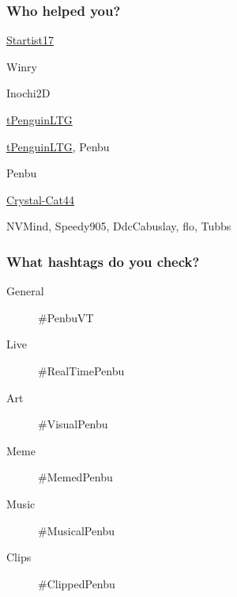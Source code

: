 \documentclass[lualatex,aspectratio=169]{beamer}
\begin{document}
  \begin{frame}
    \frametitle{Who helped you?}
    \begin{description}[align=right]
      \item[Artist] \href{https://startist17.carrd.co/}{Startist17}
      \item[Rigger] Winry
      \item[Software] Inochi2D
      \item[Music] \href{https://soundcloud.com/tpenguinltg}{tPenguinLTG}
      \item[Overlay] \href{https://github.com/tpenguinltg}{tPenguinLTG}, Penbu
      \item[Logo] Penbu
      \item[Emotes] \href{https://twitter.com/Crystal_Cat44}{Crystal-Cat44}
      \item[Special thanks] NVMind, Speedy905, DdcCabuslay, flo, Tubbs
    \end{description}
  \end{frame}

  \begin{frame}
    \frametitle{What hashtags do you check?}
    \begin{description}
      \item[General] \#PenbuVT
      \item[Live] \#RealTimePenbu
      \item[Art] \#VisualPenbu
      \item[Meme] \#MemedPenbu
      \item[Music] \#MusicalPenbu
      \item[Clips] \#ClippedPenbu
    \end{description}
  \end{frame}
\end{document}
